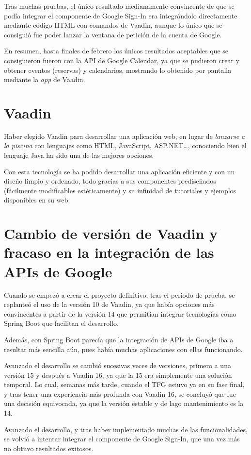 Tras muchas pruebas, el único resultado medianamente convincente de que se podía integrar el componente de Google Sign-In era integrándolo directamente mediante código HTML con comandos de Vaadin, aunque lo único que se consiguió fue poder lanzar la ventana de petición de la cuenta de Google.

En resumen, hasta finales de febrero los únicos resultados aceptables que se consiguieron fueron con la API de Google Calendar, ya que se pudieron crear y obtener eventos (reservas) y calendarios, mostrando lo obtenido por pantalla mediante la \textit{app} de Vaadin. 

\section{Vaadin}
Haber elegido Vaadin para desarrollar una aplicación web, en lugar de \textit{lanzarse a la piscina} con lenguajes como HTML, JavaScript, ASP.NET\dots, conociendo bien el lenguaje Java ha sido una de las mejores opciones. 

Con esta tecnología se ha podido desarrollar una aplicación eficiente y con un diseño limpio y ordenado, todo gracias a sus componentes prediseñados (fácilmente modificables estéticamente) y su infinidad de tutoriales y ejemplos disponibles en su web.

\section{Cambio de versión de Vaadin y fracaso en la integración de las APIs de Google}
Cuando se empezó a crear el proyecto definitivo, tras el periodo de prueba, se replanteó el uso de la versión 10 de Vaadin, ya que había opciones más convincentes a partir de la versión 14 que permitían integrar tecnologías como Spring Boot que facilitan el desarrollo. 

Además, con Spring Boot parecía que la integración de APIs de Google iba a resultar más sencilla aún, pues había muchas aplicaciones con ellas funcionando.

Avanzado el desarrollo se cambió sucesivas veces de versiones, primero a una versión 15 y después a Vaadin 16, ya que la 15 era simplemente una solución temporal. Lo cual, semanas más tarde, cuando el TFG estuvo ya en su fase final, y tras tener una experiencia más profunda con Vaadin 16, se concluyó que fue una decisión equivocada, ya que la versión estable y de lago mantenimiento es la 14.

Avanzado el desarrollo, y tras haber implementado muchas de las funcionalidades, se volvió a intentar integrar el componente de Google Sign-In, que una vez más no obtuvo resultados exitosos. 

